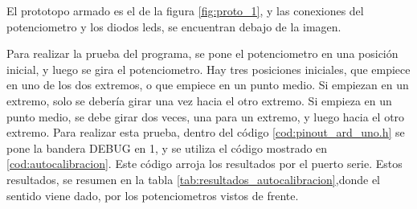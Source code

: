 El prototopo armado es el de la figura \ref{fig:proto_1}, y las conexiones del potenciometro y los diodos leds, se encuentran debajo de la imagen.  
%

Para realizar la prueba del programa, se pone el potenciometro en una posición inicial, y luego se gira el potenciometro. Hay tres posiciones iniciales, que empiece en uno de los dos extremos, o que empiece en un punto medio. Si empiezan en un extremo, solo se debería girar una vez hacia el otro extremo. Si empieza en un punto medio, se debe girar dos veces, una para un extremo, y luego hacia el otro extremo. Para realizar esta prueba, dentro del código \ref{cod:pinout_ard_uno.h} se pone la bandera DEBUG en 1, y se utiliza el código mostrado en \ref{cod:autocalibracion}. Este código arroja los resultados por el puerto serie. Estos resultados, se resumen en la tabla \ref{tab:resultados_autocalibracion},donde el sentido viene dado, por los potenciometros vistos de frente.   

